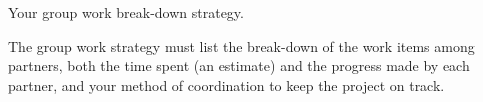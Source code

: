 Your group work break-down strategy.

The group work strategy must list the break-down of the work items among partners, both the time spent (an estimate) and the progress made by each partner, and your method of coordination to keep the project on track.
